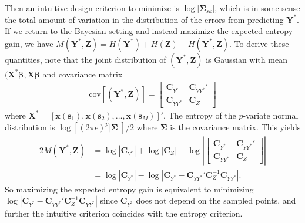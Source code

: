 \documentclass[12pt]{article}
\begin{document}
Then an intuitive design criterion to minimize is $\log|\bm{\Sigma}_{sk}|$, which is in some sense the total amount of variation in the distribution of the errors from predicting $\bm{Y}^*$. If we return to the Bayesian setting and instead maximize the expected entropy gain, we have $M(\bm{Y}^*,\bm{Z}) = H(\bm{Y}^*) + H(\bm{Z}) - H(\bm{Y}^*,\bm{Z})$. To derive these quantities, note that the joint distribution of $(\bm{Y}^*,\bm{Z})$ is Gaussian with mean $(\bm{X}^*\bm{\beta}, \bm{X}\bm{\beta}$ and covariance matrix
\begin{align*}
\mathrm{cov}[(\bm{Y}^*,\bm{Z})] = \begin{bmatrix} \bm{C}_{Y^*} & \bm{C}_{YY^*}' \\ \bm{C}_{YY^*} & \bm{C}_Z \end{bmatrix}
\end{align*} 
where $\bm{X}^* = [\bm{x}(\bm{s}_1), \bm{x}(\bm{s}_2), \dots, \bm{x}(\bm{s}_M)]'$. The entropy of the $p$-variate normal distribution is $\log[(2\pi e)^p|\bm{\Sigma}|]/2$ where $\bm{\Sigma}$ is the covariance matrix. This yields
\begin{align*}
2M(\bm{Y}^*,\bm{Z}) &= \log|\bm{C}_{Y^*}| + \log|\bm{C}_{Z}| - \log\left|\begin{bmatrix} \bm{C}_{Y^*} & \bm{C}_{YY^*}' \\ \bm{C}_{YY^*} & \bm{C}_Z \end{bmatrix}\right|\\
&= \log|\bm{C}_{Y^*}| - \log|\bm{C}_{Y^*} - \bm{C}_{YY^*}'\bm{C}_Z^{-1}\bm{C}_{YY^*}|.
\end{align*}
So maximizing the expected entropy gain is equivalent to minimizing $\log|\bm{C}_{Y^*} - \bm{C}_{YY^*}'\bm{C}_Z^{-1}\bm{C}_{YY^*}|$ since $\bm{C}_{Y^*}$ does not depend on the sampled points, and further the intuitive criterion coincides with the entropy criterion.
\end{document}
